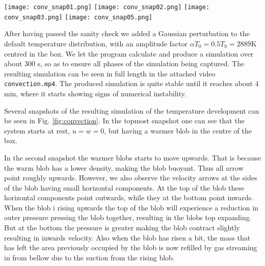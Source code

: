 \documentclass{emulateapj}
\begin{document}
	\begin{figure*}
		\texttt{[image: conv\_snap01.png]}
		\texttt{[image: conv\_snap02.png]}
		\texttt{[image: conv\_snap03.png]}
		\texttt{[image: conv\_snap05.png]}
		\caption{The figure shows several snapshots of the time evolution of the temperature (as a colour plot) and fluid velocity (quiver plot) of the simulated hydrodynamic system. The system starts at rest but with a Gaussian temperature perturbation. Then the warm gas blob starts rising, until it reaches the top of the box and partially cools off. The cold gas then drops of down on the sides, while more warm gas is rising in the blobs middle. The average total energy flux can be seen in the right upper corner of each plot.}
		\label{fig:convection}
	\end{figure*}

	After having passed the sanity check we added a Gaussian perturbation to the default temperature distribution, with an amplitude factor $\alpha T_0 = 0.5 T_0 = 2889$K centred in the box. We let the program calculate and produce a simulation over about 300 s, so as to ensure all phases of the simulation being captured. The resulting simulation can be seen in full length in the attached video \texttt{convection.mp4}. The produced simulation is quite stable until it reaches about 4 min, where it starts showing signs of numerical instability.  
	
	Several snapshots of the resulting simulation of the temperature development can be seen in Fig. \ref{fig:convection}. In the topmost snapshot one can see that the system starts at rest, $u = w = 0$, but having a warmer blob in the centre of the box. 
	
	In the second snapshot the warmer blobs starts to move upwards. That is because the warm blob has a lower density, making the blob buoyant. Thus all arrow point roughly upwards. However, we also observe the velocity arrows at the sides of the blob having small horizontal components. At the top of the blob these horizontal components point outwards, while they at the bottom point inwards. When the blob i rising upwards the top of the blob will experience a reduction in outer pressure pressing the blob together, resulting in the blobs top expanding. But at the bottom the pressure is greater making the blob contract slightly resulting in inwards velocity. Also when the blob has risen a bit, the mass that has left the area previously occupied by the blob is now refilled by gas streaming in from bellow due to the suction from the rising blob.
	
\end{document}
